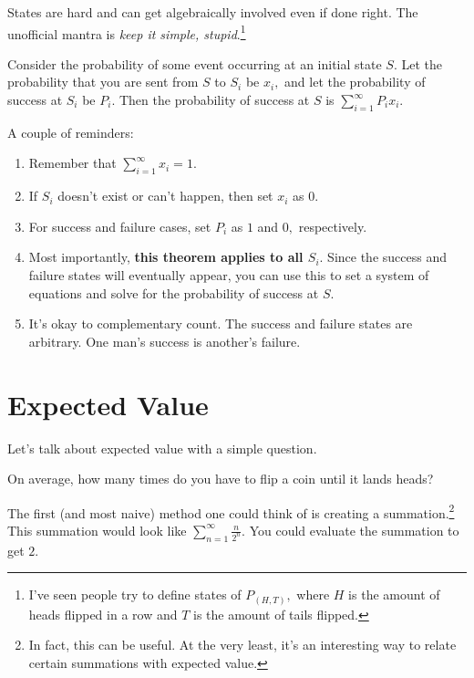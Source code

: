 \documentclass{article}
\begin{document}
States are hard and can get algebraically involved even if done right. The unofficial mantra is \textit{keep it simple, stupid}.\footnote{I've seen people try to define states of $P_{(H,T)},$ where $H$ is the amount of heads flipped in a row and $T$ is the amount of tails flipped.}
\begin{theo}
Consider the probability of some event occurring at an initial state $S.$ Let the probability that you are sent from $S$ to $S_i$ be $x_i,$ and let the probability of success at $S_i$ be $P_i.$ Then the probability of success at $S$ is $\sum\limits_{i=1}^{\infty}P_ix_i.$
\end{theo}

A couple of reminders:

\begin{enumerate}
    \item Remember that $\sum\limits_{i=1}^{\infty}x_i=1.$
    
    \item If $S_i$ doesn't exist or can't happen, then set $x_i$ as $0.$
    
    \item For success and failure cases, set $P_i$ as $1$ and $0,$ respectively.
    
    \item Most importantly, \textbf{this theorem applies to all $S_i.$} Since the success and failure states will eventually appear, you can use this to set a system of equations and solve for the probability of success at $S.$
    
    \item It's okay to complementary count. The success and failure states are arbitrary. One man's success is another's failure.
\end{enumerate}
\section{Expected Value}

Let's talk about expected value with a simple question.

\begin{exam}
On average, how many times do you have to flip a coin until it lands heads?
\end{exam}

The first (and most naive) method one could think of is creating a summation.\footnote{In fact, this can be useful. At the very least, it's an interesting way to relate certain summations with expected value.} This summation would look like $\sum_{n=1}^{\infty}\frac{n}{2^n}.$ You could evaluate the summation to get $2.$
\end{document}
